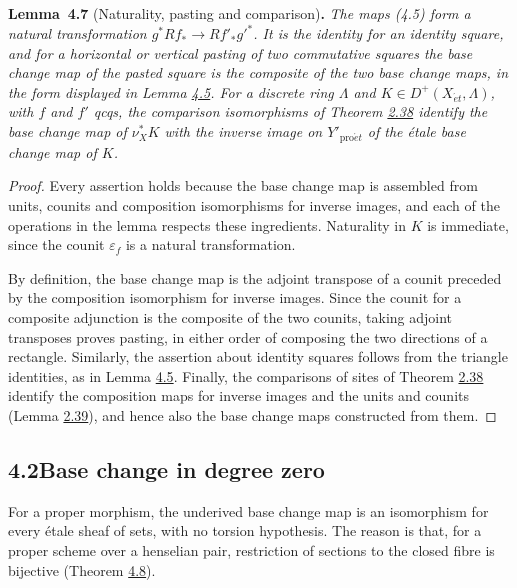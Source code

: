 \documentclass[11pt]{article}
\newenvironment{bpstatement}[2]{\par\addvspace{0.6\baselineskip}\noindent\textbf{#1}#2\textbf{.}\enspace\ignorespaces}
  {\par\addvspace{0.4\baselineskip}}
\newenvironment{bpstatementit}[2]{\begin{bpstatement}{#1}{#2}\itshape\ignorespaces}{\end{bpstatement}}
\begin{document}
\label{bp304}%
\begin{bpstatementit}{Lemma~4.7}{ (Naturality, pasting and comparison)}
The maps (4.5) form a natural transformation \(g^*Rf_*\to Rf'_*g'^*\). It is the identity for an identity square, and for a horizontal or vertical pasting of two commutative squares the base change map of the pasted square is the composite of the two base change maps, in the form displayed in Lemma \hyperref[bp299]{4.5}. For a discrete ring \(\Lambda\) and \(K\in D^+(X_{\acute{e}t},\Lambda)\), with \(f\) and \(f'\) qcqs, the comparison isomorphisms of Theorem \hyperref[bp113]{2.38} identify the base change map of \(\nu_X^*K\) with the inverse image on \(Y'_{\mathrm{pro}\acute{e}t}\) of the étale base change map of \(K\).
\end{bpstatementit}

\begin{proof}[{Proof}]\label{bp305}%
Every assertion holds because the base change map is assembled from units, counits and composition isomorphisms for inverse images, and each of the operations in the lemma respects these ingredients. Naturality in \(K\) is immediate, since the counit \(\varepsilon_f\) is a natural transformation.

By definition, the base change map is the adjoint transpose of a counit preceded by the composition isomorphism for inverse images. Since the counit for a composite adjunction is the composite of the two counits, taking adjoint transposes proves pasting, in either order of composing the two directions of a rectangle. Similarly, the assertion about identity squares follows from the triangle identities, as in Lemma \hyperref[bp299]{4.5}. Finally, the comparisons of sites of Theorem \hyperref[bp113]{2.38} identify the composition maps for inverse images and the units and counits (Lemma \hyperref[bp116]{2.39}), and hence also the base change maps constructed from them.
\end{proof}


\subsection*{\texorpdfstring{4.2\quad Base change in degree zero}{4.2 Base change in degree zero}}
\label{bp306}%
\label{bp307}%
For a proper morphism, the underived base change map is an isomorphism for every étale sheaf of sets, with no torsion hypothesis. The reason is that, for a proper scheme over a henselian pair, restriction of sections to the closed fibre is bijective (Theorem \hyperref[bp308]{4.8}).
\end{document}
